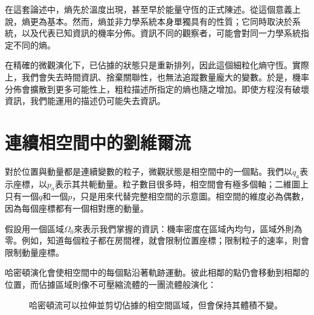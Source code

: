 在這套論述中，熵先於溫度出現，甚至早於能量守恆的正式陳述。從這個意義上說，熵更為基本。然而，熵並非力學系統本身單獨具有的性質；它同時取決於系統，以及代表已知資訊的機率分佈。資訊不同的觀察者，可能會對同一力學系統指定不同的熵。

在精確的微觀演化下，已佔據的狀態只是重新排列，因此這個細粒化熵守恆。實際上，我們會失去時間資訊、捨棄關聯性，也無法追蹤數量龐大的變數。於是，機率分佈會擴散到更多可能性上，粗粒描述所指定的熵也隨之增加。即使方程沒有破壞資訊，我們能運用的描述仍可能失去資訊。

\begin{classroomqa}
\end{classroomqa}

\section{連續相空間中的劉維爾流}

對於位置與動量都是連續變數的粒子，微觀狀態是相空間中的一個點。我們以\(q_a\)表示座標，以\(p_a\)表示其共軛動量。粒子數目很多時，相空間會有極多個軸；二維圖上只有一個\(q\)和一個\(p\)，只是用來代替完整相空間的示意圖。相空間的維度必為偶數，因為每個座標都有一個相對應的動量。

假設用一個區域\(\Omega_0\)來表示我們掌握的資訊：機率密度在區域內均勻，區域外則為零。例如，知道每個粒子都在房間裡，就會限制位置座標；限制粒子的速率，則會限制動量座標。

哈密頓演化會使相空間中的每個點沿著軌跡運動。彼此相鄰的點仍會移動到相鄰的位置，而佔據區域則像不可壓縮流體的一團流體般演化：
\begin{figure}[htbp]
\centering
{}
\caption{哈密頓流可以拉伸並剪切佔據的相空間區域，但會保持其體積不變。}
\label{fig:sm1-liouville-flow}
\end{figure}


